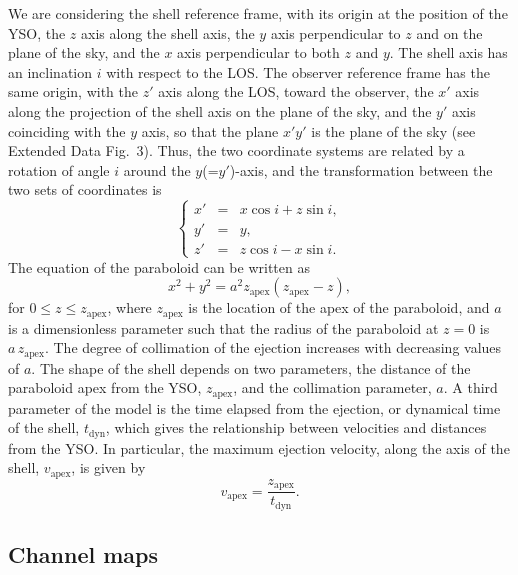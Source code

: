 \documentclass[12pt]{mythesis}
\begin{document}
We are considering the shell reference frame, with its origin at the position of the YSO, the $z$ axis along the shell axis, the $y$ axis perpendicular to $z$ and on the plane of the sky, and the $x$ axis perpendicular to both $z$ and $y$. The shell axis has an inclination $i$ with respect to the LOS. The observer reference frame has the same origin, with the $z'$ axis along the LOS, toward the observer, the $x'$ axis along the projection of the shell axis on the plane of the sky, and the $y'$ axis coinciding with the $y$ axis, so that the plane $x'y'$ is the plane of the sky (see Extended Data Fig.~3). Thus, the two coordinate systems are related by a rotation of angle $i$ around the $y$(=$y'$)-axis, and the transformation between the two sets of coordinates is
\begin{equation}\label{eq:coord}
\left\{\begin{array}{rcl}
x' &=& x \cos i + z \sin i, \\
y' &=& y, \\
z' &=& z \cos i - x \sin i.
\end{array}\right.
\end{equation}
The equation of the paraboloid can be written as
\begin{equation}\label{eq:parabola}
x^2+y^2= a^2 z_\mathrm{apex} (z_\mathrm{apex}-z),
\end{equation}
for $0\le z \le z_\mathrm{apex}$, where $z_\mathrm{apex}$ is the location of the apex of the paraboloid, and $a$ is a dimensionless parameter such that the radius of the paraboloid at $z=0$ is $a\, z_\mathrm{apex}$. %
The degree of collimation of the ejection increases with decreasing values of $a$.
The shape of the shell depends on two parameters, the distance of the paraboloid apex from the YSO, $z_\mathrm{apex}$, and the collimation parameter, $a$.
A third parameter of the model is the time elapsed from the ejection, or dynamical time of the shell, $t_\mathrm{dyn}$, which gives the relationship between velocities and distances from the YSO.
In particular, the maximum ejection velocity, along the axis of the shell, $v_\mathrm{apex}$, is given by
\begin{equation}
	v_\mathrm{apex}= \frac{z_\mathrm{apex}}{t_\mathrm{dyn}}.
\end{equation}

\subsection{Channel maps}
\end{document}

